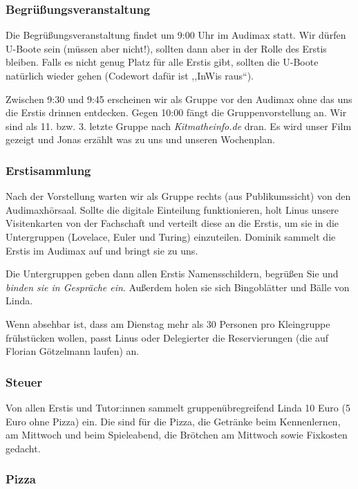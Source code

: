 \documentclass[10pt,ngerman]{scrartcl}
\begin{document}
\begin{multicols}{2}
\subsubsection{Begrüßungsveranstaltung}

Die Begrüßungsveranstaltung findet um 9:00 Uhr im Audimax statt. Wir
dürfen U-Boote sein (müssen aber nicht!), sollten dann aber in der
Rolle des Erstis bleiben. Falls es nicht genug Platz für alle Erstis
gibt, sollten die U-Boote natürlich wieder gehen (Codewort dafür ist
,,InWis raus``). 

Zwischen 9:30 und 9:45 erscheinen wir als Gruppe vor den Audimax ohne das uns
die Erstis drinnen entdecken. Gegen 10:00 fängt die Gruppenvorstellung an.  Wir
sind als 11. bzw. 3. letzte Gruppe nach \emph{Kitmatheinfo.de} dran. Es wird unser
Film gezeigt und Jonas erzählt was zu uns und unseren Wochenplan.

\subsubsection{Erstisammlung}

Nach der Vorstellung warten wir als Gruppe rechts (aus Publikumssicht) von den
Audimaxhörsaal. Sollte die digitale Einteilung funktionieren, holt Linus unsere
Visitenkarten von der Fachschaft und verteilt diese an die Erstis, um sie in
die Untergruppen (Lovelace, Euler und Turing) einzuteilen. Dominik sammelt die
Erstis im Audimax auf und bringt sie zu uns. 

Die Untergruppen geben dann allen Erstis Namensschildern, begrüßen Sie und
\emph{binden sie in Gespräche ein}. Außerdem holen sie sich Bingoblätter und Bälle von Linda.

Wenn absehbar ist, dass am Dienstag mehr als 30 Personen pro Kleingruppe frühstücken wollen, passt Linus oder Delegierter die Reservierungen (die auf Florian Götzelmann laufen) an.

\subsubsection{Steuer}

Von allen Erstis und Tutor:innen sammelt gruppenübregreifend Linda 10 Euro (5 Euro ohne Pizza) ein.
Die sind für die Pizza, die Getränke beim Kennenlernen, am Mittwoch und beim Spieleabend, die Brötchen am Mittwoch sowie Fixkosten gedacht.

\subsubsection{Pizza}


\end{multicols}
\end{document}

